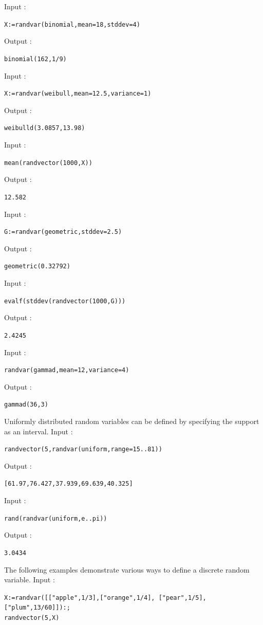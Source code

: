 \documentclass[a4paper,11pt]{book}
\begin{document}
Input :
\begin{center}
  \tt X:=randvar(binomial,mean=18,stddev=4)
\end{center}
Output :
\begin{center}
  \tt binomial(162,1/9)
\end{center}
Input :
\begin{center}
  \tt X:=randvar(weibull,mean=12.5,variance=1)
\end{center}
Output :
\begin{center}
  \tt weibulld(3.0857,13.98)
\end{center}
Input :
\begin{center}
  \tt mean(randvector(1000,X))
\end{center}
Output :
\begin{center}
  \tt 12.582
\end{center}
Input :
\begin{center}
  \tt G:=randvar(geometric,stddev=2.5)
\end{center}
Output :
\begin{center}
  \tt geometric(0.32792)
\end{center}
Input :
\begin{center}
  \tt evalf(stddev(randvector(1000,G)))
\end{center}
Output :
\begin{center}
  \tt 2.4245
\end{center}
Input :
\begin{center}
  \tt randvar(gammad,mean=12,variance=4)
\end{center}
Output :
\begin{center}
  \tt gammad(36,3)
\end{center}
Uniformly distributed random variables can be defined by specifying the support as an interval. Input :
\begin{center}
  \tt randvector(5,randvar(uniform,range=15..81))
\end{center}
Output :
\begin{center}
  \tt [61.97,76.427,37.939,69.639,40.325]
\end{center}
Input :
\begin{center}
  \tt rand(randvar(uniform,e..pi))
\end{center}
Output :
\begin{center}
  \tt 3.0434
\end{center}
The following examples demonstrate various ways to define a discrete random variable. Input :
\begin{center}
  \tt X:=randvar([["apple",1/3],["orange",1/4], ["pear",1/5],["plum",13/60]]):;\\randvector(5,X)
\end{center}
\end{document}
